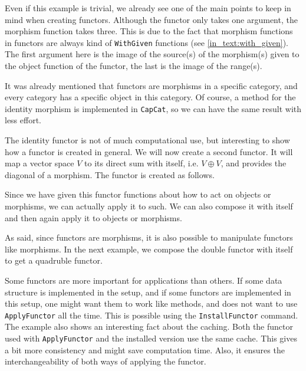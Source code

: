 Even if this example is trivial, we already see one of the main points to keep in mind when creating functors. Although the functor only takes one argument,
the morphism function takes three. This is due to the fact that morphism functions in functors are always kind of \texttt{WithGiven} functions
(see \ref{in_text:with_given}). The first
argument here is the image of the source(s) of the morphism(s) given to the object function of the functor, the last is the image of the range(s).

It was already mentioned that functors are morphisms in a specific category, and every \CapPkg category has a specific object in this category.
Of course, a method for the identity morphism is implemented in \texttt{CapCat}, so we can have the same result with less effort.

\begin{small}

\end{small}

The identity functor is not of much computational use, but interesting to show how a functor is created in general. We will now create a second functor. It will
map a vector space $V$ to its direct sum with itself, i.e. $V \oplus V$, and provides the diagonal of a morphism. The functor is created as follows.



Since we have given this functor functions about how to act on objects or morphisms, we can actually apply it to such. We can also compose it with itself
and then again apply it to objects or morphisms.

\begin{small}

\end{small}

As said, since functors are morphisms, it is also possible to manipulate functors like morphisms. In the next example, we compose the double functor with itself
to get a quadruble functor.

\begin{small}

\end{small}

Some functors are more important for applications than others. If some data structure is implemented in the \CapPkg setup, and if some functors are implemented
in this setup, one might want them to work like methods, and does not want to use \texttt{ApplyFunctor} all the time. This is possible using the \texttt{InstallFunctor}
command. The example also shows an interesting fact about the caching. Both the functor used with \texttt{ApplyFunctor} and the installed version use the same cache. This
gives a bit more consistency and might save computation time. Also, it ensures the interchangeability of both ways of applying the functor.

